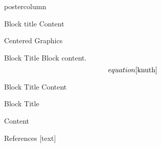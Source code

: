 \documentclass[final,hyperref={pdfpagelabels=false}]{beamer}
\begin{document}
\begin{frame}
\begin{columns}
\begin{column}{.49\textwidth}
\begin{beamercolorbox}[center,wd=\textwidth]{postercolumn}
\begin{minipage}[T]{.95\textwidth}
{							\begin{block}{Block title}
								Content \\
								\begin{center} 
									Centered Graphics
								\end{center}
							\end{block}\vfill
							
							\begin{block}{Block Title}
								Block content.\\
				
								\begin{equation}
									equation \cite{knuth}
								\end{equation}
							\end{block}\vfill
							
							\begin{block}{Block Title}
								Content
							\end{block}\vfill
				
							\begin{block}{Block Title}
									
									Content
							\end{block}\vfill

							\begin{block}{References}
								[text] %
								
							\end{block}\vfill
						}
					\end{minipage}
				\end{beamercolorbox}
			\end{column}
		\end{columns}
	\end{frame}
\end{document}
